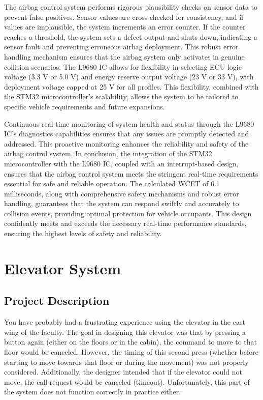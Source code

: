 \documentclass[12pt	]{article}
\begin{document}
The airbag control system performs rigorous plausibility checks on sensor data to prevent false positives. Sensor values are cross-checked for consistency, and if values are implausible, the system increments an error counter. If the counter reaches a threshold, the system sets a defect output and shuts down, indicating a sensor fault and preventing erroneous airbag deployment. This robust error handling mechanism ensures that the airbag system only activates in genuine collision scenarios. The L9680 IC allows for flexibility in selecting ECU logic voltage (3.3 V or 5.0 V) and energy reserve output voltage (23 V or 33 V), with deployment voltage capped at 25 V for all profiles. This flexibility, combined with the STM32 microcontroller's scalability, allows the system to be tailored to specific vehicle requirements and future expansions.

Continuous real-time monitoring of system health and status through the L9680 IC's diagnostics capabilities ensures that any issues are promptly detected and addressed. This proactive monitoring enhances the reliability and safety of the airbag control system. In conclusion, the integration of the STM32 microcontroller with the L9680 IC, coupled with an interrupt-based design, ensures that the airbag control system meets the stringent real-time requirements essential for safe and reliable operation. The calculated WCET of 6.1 milliseconds, along with comprehensive safety mechanisms and robust error handling, guarantees that the system can respond swiftly and accurately to collision events, providing optimal protection for vehicle occupants. This design confidently meets and exceeds the necessary real-time performance standards, ensuring the highest levels of safety and reliability.


















\newpage

\section{Elevator System}


\subsection{Project Description}
You have probably had a frustrating experience using the elevator in the east wing of the faculty. The goal in designing this elevator was that by pressing a button again (either on the floors or in the cabin), the command to move to that floor would be canceled. However, the timing of this second press (whether before starting to move towards that floor or during the movement) was not properly considered. Additionally, the designer intended that if the elevator could not move, the call request would be canceled (timeout). Unfortunately, this part of the system does not function correctly in practice either.
\end{document}
